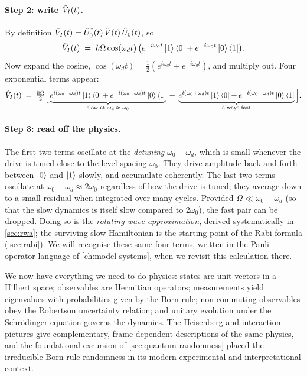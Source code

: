 \begin{example}
\paragraph{Step 2: write $\hat{V}_I(t)$.}
By definition $\hat{V}_I(t)=\hat{U}_0^\dagger(t)\,\hat{V}(t)\,\hat{U}_0(t)$,
so
\begin{equation}
\hat{V}_I(t) \;=\; \hbar\Omega\cos(\omega_d t)\,
\bigl(e^{+i\omega_0 t}\ket{1}\bra{0} + e^{-i\omega_0 t}\ket{0}\bra{1}\bigr).
\end{equation}
Now expand the cosine, $\cos(\omega_d t)=\tfrac12(e^{i\omega_d t}+e^{-i\omega_d t})$,
and multiply out. Four exponential terms appear:
\begin{equation}
\hat{V}_I(t) \;=\; \tfrac{\hbar\Omega}{2}\Bigl[\,
\underbrace{e^{i(\omega_0-\omega_d)t}\ket{1}\bra{0}
       + e^{-i(\omega_0-\omega_d)t}\ket{0}\bra{1}}_{\text{slow at $\omega_d\approx\omega_0$}}
\;+\;
\underbrace{e^{i(\omega_0+\omega_d)t}\ket{1}\bra{0}
       + e^{-i(\omega_0+\omega_d)t}\ket{0}\bra{1}}_{\text{always fast}}
\,\Bigr].
\end{equation}

\paragraph{Step 3: read off the physics.}
The first two terms oscillate at the \emph{detuning}
$\omega_0-\omega_d$, which is small whenever the drive is tuned
close to the level spacing $\omega_0$. They drive amplitude back
and forth between $\ket{0}$ and $\ket{1}$ slowly, and accumulate
coherently. The last two terms oscillate at $\omega_0+\omega_d
\approx 2\omega_0$ regardless of how the drive is tuned; they
average down to a small residual when integrated over many cycles.
Provided $\Omega\ll\omega_0+\omega_d$ (so that the slow dynamics is
itself slow compared to $2\omega_0$), the fast pair can be dropped.
Doing so is the \emph{rotating-wave approximation}, derived
systematically in \cref{sec:rwa}; the surviving slow Hamiltonian is
the starting point of the Rabi formula (\cref{sec:rabi}). We will
recognise these same four terms, written in the Pauli-operator
language of \cref{ch:model-systems}, when we revisit this
calculation there.
\end{example}

We now have everything we need to do physics: states are unit
vectors in a Hilbert space; observables are Hermitian operators;
measurements yield eigenvalues with probabilities given by the
Born rule; non-commuting observables obey the Robertson uncertainty
relation; and unitary evolution under the Schr\"odinger equation
governs the dynamics. The Heisenberg and interaction pictures give
complementary, frame-dependent descriptions of the same physics,
and the foundational excursion of \cref{sec:quantum-randomness}
placed the irreducible Born-rule randomness in its modern
experimental and interpretational context.

